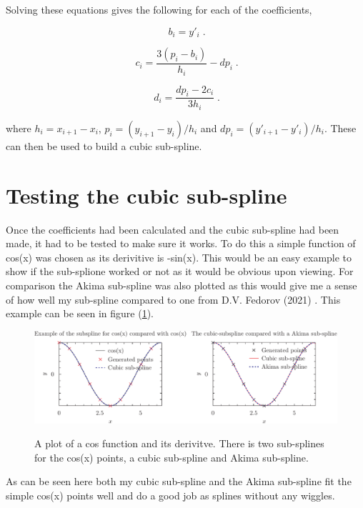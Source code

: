 \documentclass{article}
\begin{document}
\begin{Abstract}
Solving these equations gives the following for each of the coefficients,

\begin{equation}\label{bi}
\ b_i=y'_i \;.
\end{equation}

\begin{equation}\label{ci}
\ c_i=\frac{3(p_i-b_i)}{h_i}-dp_i \;.
\end{equation}

\begin{equation}\label{di}
	\ d_i=\frac{dp_i-2c_i}{3h_i} \;.
\end{equation}

where $h_i=x_{i+1}-x_i$, $p_i=(y_{i+1}-y_i)/h_i$ and $dp_i=(y'_{i+1}-y'_i)/h_i$. These can then be used to build a cubic sub-spline.


\section{Testing the cubic sub-spline}
Once the coefficients had been calculated and the cubic sub-spline had been made, it had to be tested to make sure it works. To do this a simple function of cos(x) was chosen as its derivitive is -sin(x). This would be an easy example to show if the sub-splione worked or not as it would be obvious upon viewing. For comparison the Akima sub-spline was also plotted as this would give me a sense of how well my sub-spline compared to one from D.V. Fedorov (2021) \cite{Dmitri}.
This example can be seen in figure (\ref{cos}).

\begin{figure}[h]
\begin{center}
\label{cos}
\includegraphics{cos.pdf}
\caption{A plot of a cos function and its derivitve. There is two sub-splines for the cos(x) points, a cubic sub-spline and Akima sub-spline.}
\end{center}
\end{figure}

As can be seen here both my cubic sub-spline and the Akima sub-spline fit the simple cos(x) points well and do a good job as splines without any wiggles.


\end{Abstract}
\end{document}
